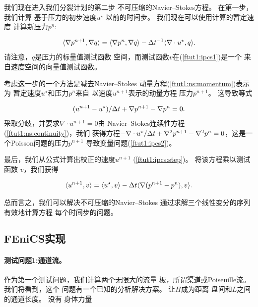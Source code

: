 我们现在进入我们分裂计划的第二步
不可压缩的Navier--Stokes方程。 在第一步，我们计算
基于压力的初步速度$u^{\star}$
以前的时间步。 我们现在可以使用计算的暂定速度
计算新压力$p^n$:

\begin{equation}
\label{ftut1:ipcs2}
  \langle \nabla p^{n+1}, \nabla q \rangle
  = \langle {\nabla p^{n}},{\nabla q} \rangle
  - \Delta t^{-1} \langle{\nabla \cdot u^{\star}},{q} \rangle.
\end{equation}
请注意，$q$是压力的标量值测试函数
空间，而测试函数$v$在(\ref{ftut1:ipcs1})是一个
来自速度空间的向量值测试函数。

考虑这一步的一个方法是减去Navier--Stokes
动量方程(\ref{ftut1:ns:momentum})表示为
暂定速度$u^{\star}$和压力$p^n$来自
以速度$u^{n+1}$表示的动量方程
压力$p^{n+1}$。 这导致等式

\begin{equation} \label{ftut1:ipcs:step}
  (u^{n+1} - u^{\star}) / \Delta t + \nabla p^{n+1} - \nabla p^n = 0.
\end{equation}
采取分歧，并要求$\nabla \cdot u^{n+1} = 0$由
Navier--Stokes连续性方程(\ref{ftut1:ns:continuity})，我们
获得方程$-\nabla\cdot u^{\star} / \Delta t + \nabla^2 p^{n+1} -
\nabla^2 p^n = 0$，这是一个Poisson问题的压力$p^{n+1}$
导致变量问题(\ref{ftut1:ipcs2})。

最后，我们从公式计算出校正的速度$u^{n+1}$
(\ref{ftut1:ipcs:step})。 将该方程乘以测试函数
$v$，我们获得

\begin{equation}
\label{ftut1:ipcs3}
  \langle {u^{n+1}},{v} \rangle
  =
  \langle {u^{\star}},{v} \rangle
  - \Delta t \langle {\nabla(p^{n+1}-p^{n})},{v} \rangle.
\end{equation}

总而言之，我们可以解决不可压缩的Navier--Stokes
通过求解三个线性变分的序列有效地计算方程
每个时间步的问题。

\subsection{FEniCS实现}

\paragraph{测试问题1:通道流。}

作为第一个测试问题，我们计算两个无限大的流量
板，所谓渠道或Poiseuille流。 我们将看到，这个
问题有一个已知的分析解决方案。 让$H$成为距离
盘间和$L$之间的通道长度。 没有
身体力量

